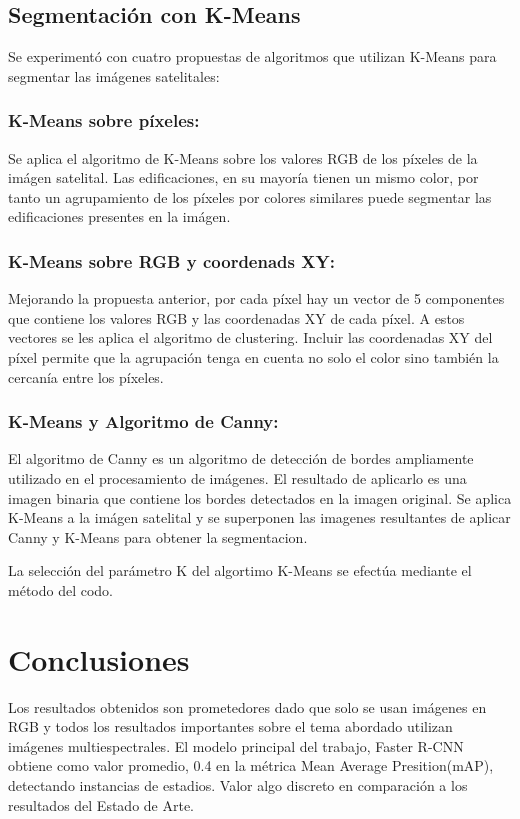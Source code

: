 \documentclass[article]{llncs}
\begin{document}
\subsection{Segmentaci\'on con K-Means}

Se experiment\'o con cuatro propuestas de algoritmos que utilizan K-Means para segmentar las im\'agenes satelitales:

\subsubsection{K-Means sobre p\'ixeles:}
Se aplica el algoritmo de K-Means sobre los valores RGB de los p\'ixeles de la im\'agen satelital. Las edificaciones, 
en su mayor\'ia tienen un mismo color, por tanto un agrupamiento de los p\'ixeles por colores similares puede segmentar 
las edificaciones presentes en la im\'agen.

\subsubsection{K-Means sobre RGB y coordenads XY:}
Mejorando la propuesta anterior, por cada p\'ixel hay un vector de 5 componentes 
que contiene los valores RGB y las coordenadas XY de cada p\'ixel. A estos vectores se les aplica el algoritmo de clustering. Incluir 
las coordenadas XY del p\'ixel permite que la agrupaci\'on tenga en cuenta no solo el color sino también la cercan\'ia 
entre los p\'ixeles. 

\subsubsection{K-Means y Algoritmo de Canny:}
El algoritmo de Canny es un algoritmo de detección de bordes ampliamente utilizado en el procesamiento de imágenes. 
El resultado de aplicarlo es una imagen binaria que contiene los bordes detectados en la imagen original. Se aplica 
K-Means a la im\'agen satelital y se superponen las imagenes resultantes de aplicar Canny y K-Means para obtener la segmentacion.

La selecci\'on del par\'ametro K del algortimo K-Means se efect\'ua mediante el m\'etodo del codo. 

\section{Conclusiones}
Los resultados obtenidos son prometedores dado que solo se usan im\'agenes en RGB y todos los resultados importantes 
sobre el tema abordado utilizan im\'agenes multiespectrales. El modelo principal del trabajo, Faster R-CNN  
obtiene como valor promedio, 0.4 en la m\'etrica Mean Average Presition(mAP), detectando instancias de estadios. Valor 
algo discreto en comparación a los resultados del Estado de Arte. 
\end{document}
